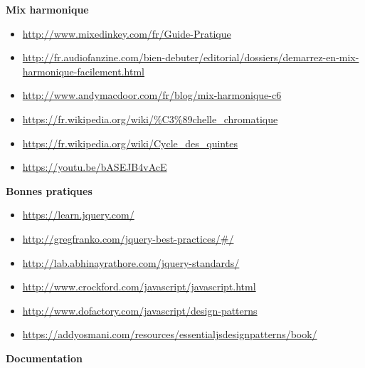 \documentclass[a4paper,12pt]{article}
\begin{document}
\textbf{Mix harmonique}

\begin{itemize}
 \item{\url{http://www.mixedinkey.com/fr/Guide-Pratique}}
 \item{\url{http://fr.audiofanzine.com/bien-debuter/editorial/dossiers/demarrez-en-mix-harmonique-facilement.html}}
 \item{\url{http://www.andymacdoor.com/fr/blog/mix-harmonique-c6}}
 \item{\url{https://fr.wikipedia.org/wiki/\%C3\%89chelle\_chromatique}}
 \item{\url{https://fr.wikipedia.org/wiki/Cycle_des_quintes}}
 \item{\url{https://youtu.be/bASEJB4vAcE}}
\end{itemize}

\textbf{Bonnes pratiques}

\begin{itemize}
 \item{\url{https://learn.jquery.com/}}
 \item{\url{http://gregfranko.com/jquery-best-practices/#/}}
 \item{\url{http://lab.abhinayrathore.com/jquery-standards/}}
 \item{\url{http://www.crockford.com/javascript/javascript.html}}
 \item{\url{http://www.dofactory.com/javascript/design-patterns}}
 \item{\url{https://addyosmani.com/resources/essentialjsdesignpatterns/book/}}
\end{itemize}

\textbf{Documentation}
\end{document}
